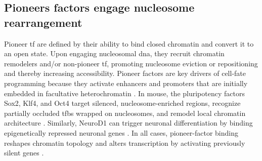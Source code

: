 \documentclass[11pt]{book}
\begin{document}
\subsection{Pioneers factors engage nucleosome rearrangement}
Pioneer \gls{tf} are defined by their ability to bind closed chromatin and convert it to an open state. Upon engaging nucleosomal \gls{dna}, they recruit chromatin remodelers and/or non-pioneer \gls{tf}, promoting nucleosome eviction or repositioning and thereby increasing accessibility. Pioneer factors are key drivers of cell-fate programming because they activate enhancers and promoters that are initially embedded in facultative heterochromatin \cite{balsalobre_pioneer_2022}. In mouse, the pluripotency factors Sox2, Klf4, and Oct4 target silenced, nucleosome-enriched regions, recognize partially occluded \gls{tfbs} wrapped on nucleosomes, and remodel local chromatin architecture \cite{soufi_pioneer_2015, stadhouders_transcription_2018}. Similarly, NeuroD1 can trigger neuronal differentiation by binding epigenetically repressed neuronal genes \cite{pataskar_neurod1_2016}. In all cases, pioneer-factor binding reshapes chromatin topology and alters transcription by activating previously silent genes \cite{stadhouders_transcription_2018}.
\end{document}

